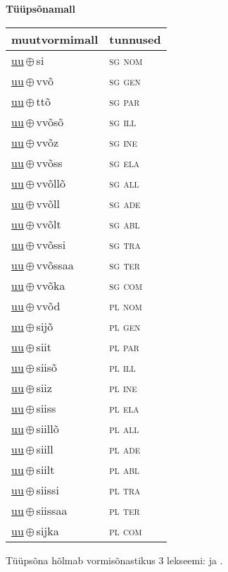 

\vspace{3.5em}
\noindent \begin{minipage}{\textwidth}
\noindent \textbf{Tüüpsõnamall \,}\\

\begin{sideways}
\begin{tabular}{l l}
muutvormimall & tunnused \\
\hline
\underline{uu}\,$\oplus$\,si & \textsc{ sg nom } \\
\underline{uu}\,$\oplus$\,vvõ & \textsc{ sg gen } \\
\underline{uu}\,$\oplus$\,ttõ & \textsc{ sg par } \\
\underline{uu}\,$\oplus$\,vvõsõ & \textsc{ sg ill } \\
\underline{uu}\,$\oplus$\,vvõz & \textsc{ sg ine } \\
\underline{uu}\,$\oplus$\,vvõss & \textsc{ sg ela } \\
\underline{uu}\,$\oplus$\,vvõllõ & \textsc{ sg all } \\
\underline{uu}\,$\oplus$\,vvõll & \textsc{ sg ade } \\
\underline{uu}\,$\oplus$\,vvõlt & \textsc{ sg abl } \\
\underline{uu}\,$\oplus$\,vvõssi & \textsc{ sg tra } \\
\underline{uu}\,$\oplus$\,vvõssaa & \textsc{ sg ter } \\
\underline{uu}\,$\oplus$\,vvõka & \textsc{ sg com } \\
\underline{uu}\,$\oplus$\,vvõd & \textsc{ pl nom } \\
\underline{uu}\,$\oplus$\,sijõ & \textsc{ pl gen } \\
\underline{uu}\,$\oplus$\,siit & \textsc{ pl par } \\
\underline{uu}\,$\oplus$\,siisõ & \textsc{ pl ill } \\
\underline{uu}\,$\oplus$\,siiz & \textsc{ pl ine } \\
\underline{uu}\,$\oplus$\,siiss & \textsc{ pl ela } \\
\underline{uu}\,$\oplus$\,siillõ & \textsc{ pl all } \\
\underline{uu}\,$\oplus$\,siill & \textsc{ pl ade } \\
\underline{uu}\,$\oplus$\,siilt & \textsc{ pl abl } \\
\underline{uu}\,$\oplus$\,siissi & \textsc{ pl tra } \\
\underline{uu}\,$\oplus$\,siissaa & \textsc{ pl ter } \\
\underline{uu}\,$\oplus$\,sijka & \textsc{ pl com } \\
\end{tabular}
\end{sideways}
\label{tab:tüüpsõnamall-uusi}

\end{minipage}

 
\vspace{1em}
\noindent Tüüpsõna hõlmab vormisõnastikus 3 lekseemi:  ja .
